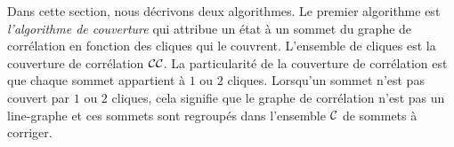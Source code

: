 

Dans cette section, nous d\'ecrivons deux algorithmes. 
Le premier algorithme est {\em l'algorithme de couverture} qui attribue un \'etat \`a un sommet du graphe de corr\'elation en fonction des cliques qui le couvrent. L'ensemble de cliques est la couverture de corr\'elation ${\cal CC}$. La particularit\'e de la couverture de corr\'elation est que chaque sommet appartient \`a $1$ ou $2$ cliques. Lorsqu'un  sommet  n'est pas couvert par $1$ ou $2$ cliques, cela signifie que le graphe de corr\'elation n'est pas un line-graphe et ces sommets sont regroup\'es dans l'ensemble $\cal C$ de sommets \`a corriger.
\newline



